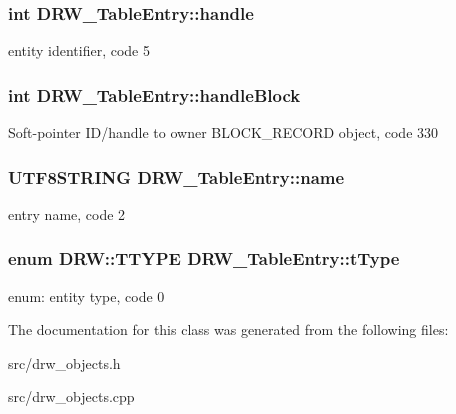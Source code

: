 \subsubsection[{handle}]{\setlength{\rightskip}{0pt plus 5cm}int D\+R\+W\+\_\+\+Table\+Entry\+::handle}\label{class_d_r_w___table_entry_a9aefd859bd8a3d423f53623f8f089ac3}
entity identifier, code 5 \hypertarget{class_d_r_w___table_entry_a91713970d0eec5baf8aa16b8c5556ce7}{}
\subsubsection[{handle\+Block}]{\setlength{\rightskip}{0pt plus 5cm}int D\+R\+W\+\_\+\+Table\+Entry\+::handle\+Block}\label{class_d_r_w___table_entry_a91713970d0eec5baf8aa16b8c5556ce7}
Soft-\/pointer I\+D/handle to owner B\+L\+O\+C\+K\+\_\+\+R\+E\+C\+O\+R\+D object, code 330 \hypertarget{class_d_r_w___table_entry_a854ab48893457e607ac13425304415b4}{}
\subsubsection[{name}]{\setlength{\rightskip}{0pt plus 5cm}U\+T\+F8\+S\+T\+R\+I\+N\+G D\+R\+W\+\_\+\+Table\+Entry\+::name}\label{class_d_r_w___table_entry_a854ab48893457e607ac13425304415b4}
entry name, code 2 \hypertarget{class_d_r_w___table_entry_a4ceb84db2231dcc1c3070e5825966a0d}{}
\subsubsection[{t\+Type}]{\setlength{\rightskip}{0pt plus 5cm}enum D\+R\+W\+::\+T\+T\+Y\+P\+E D\+R\+W\+\_\+\+Table\+Entry\+::t\+Type}\label{class_d_r_w___table_entry_a4ceb84db2231dcc1c3070e5825966a0d}
enum\+: entity type, code 0 

The documentation for this class was generated from the following files\+:\begin{DoxyCompactItemize}
\item 
src/drw\+\_\+objects.\+h\item 
src/drw\+\_\+objects.\+cpp\end{DoxyCompactItemize}
